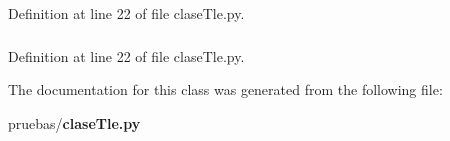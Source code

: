 \-Definition at line 22 of file clase\-Tle.\-py.

\subsubsection[{v}]{}\label{classpruebas_1_1clase_tle_1_1_posicion_ada401119d689840f5eb3414394875b16}


\-Definition at line 22 of file clase\-Tle.\-py.



\-The documentation for this class was generated from the following file\-:\begin{DoxyCompactItemize}
\item 
pruebas/{\bf clase\-Tle.\-py}\end{DoxyCompactItemize}
